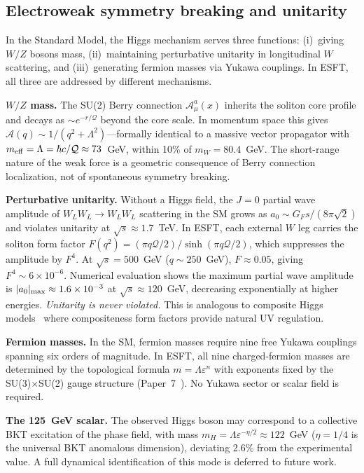 \documentclass[a4paper,12pt]{article}
\newcommand{\Qoppa}{\mathcal{Q}} %
\begin{document}
\subsection{Electroweak symmetry breaking and unitarity}
\label{sec:ewsb}

In the Standard Model, the Higgs mechanism serves three functions:
(i)~giving $W/Z$ bosons mass, (ii)~maintaining perturbative unitarity
in longitudinal $W$ scattering, and (iii)~generating fermion masses via
Yukawa couplings. In ESFT, all three are addressed by different mechanisms.

\textbf{$W/Z$ mass.} The SU(2) Berry connection $\mathcal{A}_\mu^a(x)$
inherits the soliton core profile and decays as $\sim e^{-r/\Qoppa}$
beyond the core scale. In momentum space this gives
$\mathcal{A}(q) \sim 1/(q^2 + \Lambda^2)$---formally identical to
a massive vector propagator with $m_{\rm eff} = \Lambda = \hbar c/\Qoppa
\approx 73$~GeV, within 10\% of $m_W = 80.4$~GeV. The short-range nature
of the weak force is a geometric consequence of Berry connection
localization, not of spontaneous symmetry breaking.

\textbf{Perturbative unitarity.} Without a Higgs field, the $J=0$ partial
wave amplitude of $W_L W_L \to W_L W_L$ scattering in the SM grows as
$a_0 \sim G_F s / (8\pi\sqrt{2})$ and violates unitarity at
$\sqrt{s} \approx 1.7$~TeV. In ESFT, each external $W$ leg carries the
soliton form factor $F(q^2) = (\pi q \Qoppa/2)/\sinh(\pi q \Qoppa/2)$,
which suppresses the amplitude by $F^4$. At $\sqrt{s} = 500$~GeV
($q \sim 250$~GeV), $F \approx 0.05$, giving $F^4 \sim 6\times 10^{-6}$.
Numerical evaluation shows the maximum partial wave amplitude is
$|a_0|_{\rm max} \approx 1.6 \times 10^{-3}$ at $\sqrt{s} \approx 120$~GeV,
decreasing exponentially at higher energies. \emph{Unitarity is never violated.}
This is analogous to composite Higgs models~\cite{Kaplan1984,Agashe2005}
where compositeness form factors provide natural UV regulation.

\textbf{Fermion masses.} In the SM, fermion masses require nine
free Yukawa couplings spanning six orders of magnitude. In ESFT,
all nine charged-fermion masses are determined by the topological
formula $m = \Lambda\varepsilon^n$ with exponents fixed by the
SU(3)$\times$SU(2) gauge structure (Paper~7~\cite{Paper7}). No Yukawa
sector or scalar field is required.

\textbf{The 125~GeV scalar.} The observed Higgs boson may correspond
to a collective BKT excitation of the phase field, with mass
$m_H = \Lambda\varepsilon^{-\eta/2} \approx 122$~GeV
($\eta = 1/4$ is the universal BKT anomalous dimension),
deviating 2.6\% from the experimental value. A full dynamical
identification of this mode is deferred to future work.
\end{document}
